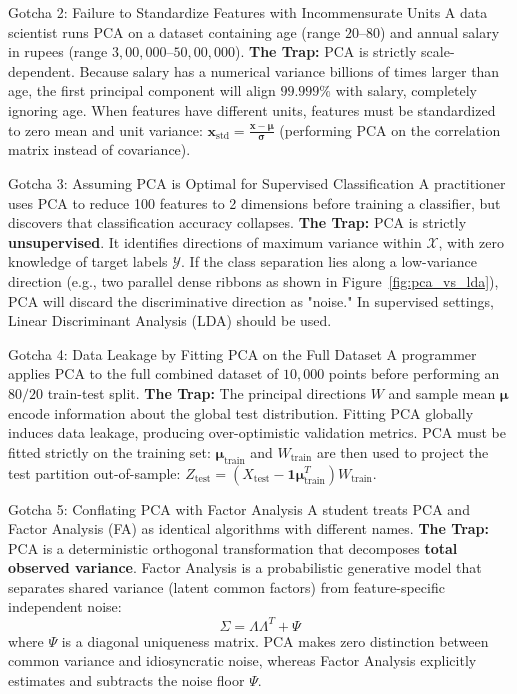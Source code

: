 \begin{trapbox}{Gotcha 2: Failure to Standardize Features with Incommensurate Units}
A data scientist runs PCA on a dataset containing age (range $20$--$80$) and annual salary in rupees (range $3{,}00{,}000$--$50{,}00{,}000$).
\textbf{The Trap:} PCA is strictly scale-dependent. Because salary has a numerical variance billions of times larger than age, the first principal component will align $99.999\%$ with salary, completely ignoring age. When features have different units, features must be standardized to zero mean and unit variance: $\mathbf{x}_{\text{std}} = \frac{\mathbf{x} - \boldsymbol{\mu}}{\boldsymbol{\sigma}}$ (performing PCA on the correlation matrix instead of covariance).
\end{trapbox}

\begin{trapbox}{Gotcha 3: Assuming PCA is Optimal for Supervised Classification}
A practitioner uses PCA to reduce 100 features to 2 dimensions before training a classifier, but discovers that classification accuracy collapses.
\textbf{The Trap:} PCA is strictly \textbf{unsupervised}. It identifies directions of maximum variance within $\mathcal{X}$, with zero knowledge of target labels $\mathcal{Y}$. If the class separation lies along a low-variance direction (e.g., two parallel dense ribbons as shown in Figure~\ref{fig:pca_vs_lda}), PCA will discard the discriminative direction as "noise." In supervised settings, Linear Discriminant Analysis (LDA) should be used.
\end{trapbox}

\begin{trapbox}{Gotcha 4: Data Leakage by Fitting PCA on the Full Dataset}
A programmer applies PCA to the full combined dataset of $10{,}000$ points before performing an $80/20$ train-test split.
\textbf{The Trap:} The principal directions $W$ and sample mean $\boldsymbol{\mu}$ encode information about the global test distribution. Fitting PCA globally induces data leakage, producing over-optimistic validation metrics. PCA must be fitted strictly on the training set: $\boldsymbol{\mu}_{\text{train}}$ and $W_{\text{train}}$ are then used to project the test partition out-of-sample: $Z_{\text{test}} = (X_{\text{test}} - \mathbf{1}\boldsymbol{\mu}_{\text{train}}^T) W_{\text{train}}$.
\end{trapbox}

\begin{trapbox}{Gotcha 5: Conflating PCA with Factor Analysis}
A student treats PCA and Factor Analysis (FA) as identical algorithms with different names.
\textbf{The Trap:} PCA is a deterministic orthogonal transformation that decomposes \textbf{total observed variance}. Factor Analysis is a probabilistic generative model that separates shared variance (latent common factors) from feature-specific independent noise:
\begin{equation*}
\Sigma = \Lambda \Lambda^T + \Psi
\end{equation*}
where $\Psi$ is a diagonal uniqueness matrix. PCA makes zero distinction between common variance and idiosyncratic noise, whereas Factor Analysis explicitly estimates and subtracts the noise floor $\Psi$.
\end{trapbox}

